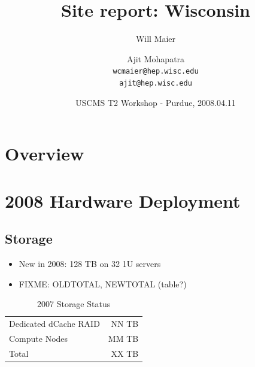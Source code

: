 \documentclass{beamer}
\title{Site report: Wisconsin}
\author[Maier, Mohapatra]{
    Will Maier \and Ajit Mohapatra\\ 
    {\tt wcmaier@hep.wisc.edu}\\
    {\tt ajit@hep.wisc.edu}}
\institute[Wisconsin]{University of Wisconsin - High Energy Physics}
\date[2008.04.11]{USCMS T2 Workshop - Purdue, 2008.04.11}
\begin{document}
%
%
%


\begin{frame}
    \titlepage
\end{frame}

\section{Overview}
\begin{frame}
    \tableofcontents
\end{frame}

\section{2008 Hardware Deployment}
\subsection{Storage}
\begin{frame}
\begin{itemize}
    \item New in 2008: 128 TB on 32 1U servers
    \item FIXME: OLDTOTAL, NEWTOTAL (table?)
\end{itemize}
\begin{table}
    \begin{tabular}{lr}
        \toprule
        Dedicated dCache RAID & NN TB \\
        Compute Nodes & MM TB \\
        Total & XX TB \\
        \bottomrule
    \end{tabular}
    \caption{2007 Storage Status}
    \label{2007_storage_status}
\end{table}
\end{frame}
\end{document}
